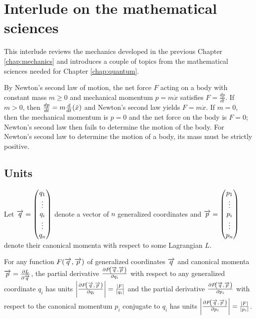 

\chapter{Interlude on the mathematical sciences}

This interlude reviews the mechanics developed in the previous Chapter \ref{chap:mechanics} and introduces a couple of topics from the mathematical sciences needed for Chapter \ref{chap:quantum}.

By Newton's second law of motion, the net force $F$ acting on a body with constant mass $m \geq 0$ and mechanical momentum $p = m \dot{x}$ satisfies $F = \frac{dp}{dt}$.
If $m > 0$, then $\frac{dp}{dt} = m \frac{d}{dt}\!\left(\dot{x}\right)$ and Newton's second law yields $F = m \ddot{x}$.
If $m = 0$, then the mechanical momentum is $p = 0$ and the net force on the body is $F = 0$; Newton's second law then fails to determine the motion of the body.
For Newton's second law to determine the motion of a body, its mass must be strictly positive.

\section{Units}\label{sec:units}

Let $\overrightarrow{q} = \begin{pmatrix} q_1 \\ \vdots \\ q_i \\ \vdots \\ q_n \end{pmatrix}$ denote a vector of $n$ generalized coordinates and $\overrightarrow{p} = \begin{pmatrix} p_1 \\ \vdots \\ p_i \\ \vdots \\ p_n \end{pmatrix}$ denote their canonical momenta with respect to some Lagrangian $L$.

\begin{remark}\label{rem:derivative}
	For any function $F\!\left(\overrightarrow{q}, \overrightarrow{p}\right)$ of generalized coordinates $\overrightarrow{q}$ and canonical momenta $\overrightarrow{p} = \frac{\partial L}{\partial \dot{\overrightarrow{q}}}$, the partial derivative $\frac{\partial F\!\left(\overrightarrow{q}, \overrightarrow{p}\right)}{\partial q_i}$ with respect to any generalized coordinate $q_i$ has units $\left|\frac{\partial F\!\left(\overrightarrow{q}, \overrightarrow{p}\right)}{\partial q_i}\right| = \frac{\left|F\right|}{\left|q_i\right|}$ and the partial derivative $\frac{\partial F\!\left(\overrightarrow{q}, \overrightarrow{p}\right)}{\partial p_i}$ with respect to the canonical momentum $p_i$ conjugate to $q_i$ has units $\left|\frac{\partial F\!\left(\overrightarrow{q}, \overrightarrow{p}\right)}{\partial p_i}\right| = \frac{\left|F\right|}{\left|p_i\right|}$.
\end{remark}


